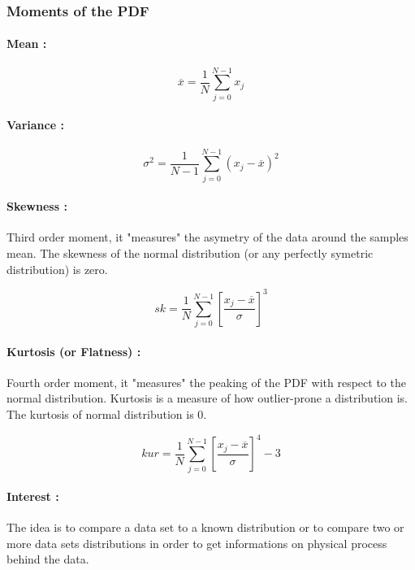 \subsubsection{Moments of the PDF}

\paragraph{Mean :}
\begin{equation}
    \overline{x} = \frac{1}{N} \sum_{j=0}^{N-1} x_j
\end{equation}

\paragraph{Variance :}

\begin{equation}
    \sigma^2 = \frac{1}{N-1} \sum_{j=0} ^{N-1} (x_j - \overline{x})^2
\end{equation}

\paragraph{Skewness :}
Third order moment, it "measures" the asymetry of the data around the samples mean. The skewness of the normal distribution (or any perfectly symetric distribution) is zero. 

\begin{equation}
    sk= \frac{1}{N} \sum_{j=0} ^{N-1} \left[\frac{x_j-\overline{x}}{\sigma}\right]^3
\end{equation}

\paragraph{Kurtosis (or Flatness) :}
Fourth order moment, it "measures" the peaking of the PDF with respect to the normal distribution. Kurtosis is a measure of how outlier-prone a distribution is. The kurtosis of normal distribution is 0. 

\begin{equation}
    kur = \frac{1}{N}\sum_{j=0}^{N-1}\left[\frac{x_j - \overline{x}}{\sigma}\right]^4-3
\end{equation}

\paragraph{Interest :}
The idea is to compare a data set to a known distribution or to compare two or more data sets distributions in order to get informations on physical process behind the data. 


